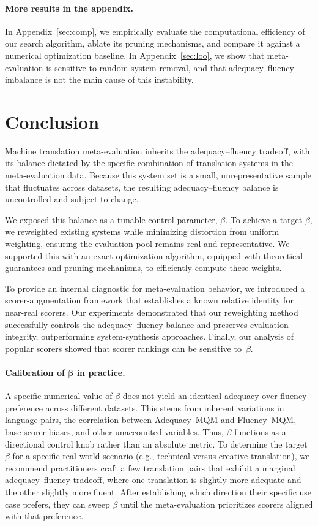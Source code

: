 \documentclass[11pt]{article}
\begin{document}
\paragraph{More results in the appendix.} In Appendix~\ref{sec:comp}, we empirically evaluate the computational efficiency of our search algorithm, ablate its pruning mechanisms, and compare it against a numerical optimization baseline. In Appendix~\ref{sec:loo}, we show that meta-evaluation is sensitive to random system removal, and that adequacy--fluency imbalance is not the main cause of this instability.

\section{Conclusion}

Machine translation meta-evaluation inherits the adequacy–fluency tradeoff, with its balance dictated by the specific combination of translation systems in the meta-evaluation data. Because this system set is a small, unrepresentative sample that fluctuates across datasets, the resulting adequacy–fluency balance is uncontrolled and subject to change.

We exposed this balance as a tunable control parameter, $\beta$. To achieve a target $\beta$, we reweighted existing systems while minimizing distortion from uniform weighting, ensuring the evaluation pool remains real and representative. We supported this with an exact optimization algorithm, equipped with theoretical guarantees and pruning mechanisms, to efficiently compute these weights.

To provide an internal diagnostic for meta-evaluation behavior, we introduced a scorer-augmentation framework that establishes a known relative identity for near-real scorers. Our experiments demonstrated that our reweighting method successfully controls the adequacy–fluency balance and preserves evaluation integrity, outperforming system-synthesis approaches. Finally, our analysis of popular scorers showed that scorer rankings can be sensitive to~$\beta$.

\paragraph{Calibration of $\boldsymbol\beta$ in practice.}
A specific numerical value of $\beta$ does not yield an identical adequacy-over-fluency preference across different datasets. This stems from inherent variations in language pairs, the correlation between Adequacy~MQM and Fluency~MQM, base scorer biases, and other unaccounted variables. Thus, $\beta$ functions as a directional control knob rather than an absolute metric. To determine the target $\beta$ for a specific real-world scenario (e.g., technical versus creative translation), we recommend practitioners craft a few translation pairs that exhibit a marginal adequacy–fluency tradeoff, where one translation is slightly more adequate and the other slightly more fluent. After establishing which direction their specific use case prefers, they can sweep $\beta$ until the meta-evaluation prioritizes scorers aligned with that preference.
\end{document}
